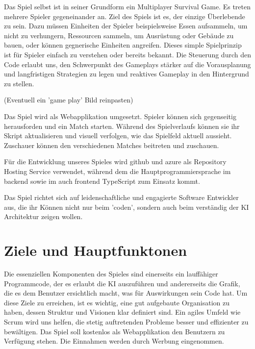 \documentclass[a4paper, 11pt]{scrartcl}
\let\oldsection\section
\renewcommand\section{\clearpage\oldsection}
\begin{document}
Das Spiel selbst ist in seiner Grundform ein Multiplayer Survival Game.
Es treten mehrere Spieler gegeneinander an.
Ziel des Spiels ist es, der einzige Überlebende zu sein.
Dazu müssen Einheiten der Spieler beispielsweise Essen aufsammeln,
um nicht zu verhungern, Ressourcen sammeln, um Ausrüstung oder Gebäude zu bauen,
oder können gegnerische Einheiten angreifen.
Dieses simple Spielprinzip ist für Spieler einfach zu verstehen oder bereits bekannt.
Die Steuerung durch den Code erlaubt uns,
den Schwerpunkt des Gameplays stärker auf die Vorausplanung und langfristigen Strategien
zu legen und reaktives Gameplay in den Hintergrund zu stellen.

(Eventuell ein 'game play' Bild reinpasten)

Das Spiel wird als Webapplikation umgesetzt.
Spieler können sich gegenseitig herausforden und ein Match starten.
Während des Spielverlaufs können sie ihr Skript aktualisieren und visuell verfolgen,
wie das Spielfeld aktuell aussieht. Zuschauer können den verschiedenen Matches beitreten und zuschauen.

Für die Entwicklung unseres Spieles wird github und azure als Repository Hosting Service verwendet,
während dem die Hauptprogrammiersprache im backend sowie im auch frontend TypeScript zum Einsatz kommt.

Das Spiel richtet sich auf leidenschaftliche und engagierte Software Entwickler aus,
die ihr Können nicht nur beim 'coden', sondern auch beim verständig der KI Architektur zeigen wollen.

\section{Ziele und Hauptfunktonen}

Die essenziellen Komponenten des Spieles sind einerseits ein lauffähiger Programmcode, der es erlaubt
die KI auszuführen und andererseits die Grafik, die es dem Benutzer ersichtlich macht, was für Auswirkungen
sein Code hat.
Um diese Ziele zu erreichen, ist es wichtig, eine gut aufgebaute Organisation zu haben, dessen Struktur und
Visionen klar definiert sind. Ein agiles Umfeld wie Scrum wird uns helfen, die stetig auftretenden Probleme
besser und effizienter zu bewältigen.
Das Spiel soll kostenlos als Webapplikation den Benutzern zu Verfügung stehen. Die Einnahmen werden
durch Werbung eingenommen.
\end{document}
